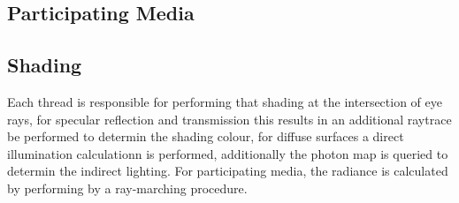 \subsection{Participating Media}

\subsection{Shading}
Each thread is responsible for performing that shading at the intersection of eye rays, for specular reflection
and transmission this results in an additional raytrace be performed to determin the shading colour, for diffuse
surfaces a direct illumination calculationn is performed, additionally the photon map is queried to determin
the indirect lighting. For participating media, the radiance is calculated by performing by a ray-marching
procedure.
